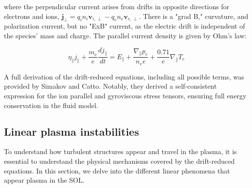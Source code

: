 where the perpendicular current arises from drifts in opposite directions for electrons and ions, $\mathbf{j}_\perp = q_i n_i \mathbf{v}_{i,\perp} - q_e n_e \mathbf{v}_{e,\perp}$. There is a "grad B," curvature, and polarization current, but no "ExB" current, as the electric drift is independent of the species' mass and charge. The parallel current density is given by Ohm's law:

\begin{equation}
	\eta_\parallel j_\parallel + \frac{m_e}{e}\frac{dj_\parallel}{dt} = E_\parallel + \frac{\nabla_\parallel p_e}{n_e e} + \frac{0.71}{e}\nabla_\parallel T_e
\end{equation}

A full derivation of the drift-reduced equations, including all possible terms, was provided by Simakov and Catto\cite{simakov_2003}. Notably, they derived a self-consistent expression for the ion parallel and gyroviscous stress tensors, ensuring full energy conservation in the fluid model.




\subsection{Linear plasma instabilities}
\label{ssec:edge_linearDriftWaves}

To understand how turbulent structures appear and travel in the plasma, it is essential to understand the physical mechanisms covered by the drift-reduced equations. In this section, we delve into the different linear phenomena that appear plasma in the SOL.



